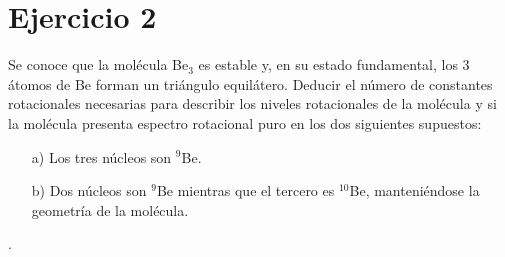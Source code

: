 \documentclass{article}
\begin{document}
\section*{Ejercicio 2}
Se conoce que la molécula Be$_3$ es estable y, en su estado fundamental, los 3 átomos de Be forman un triángulo equilátero. Deducir el número de constantes rotacionales necesarias para describir los niveles rotacionales de la molécula y si la molécula presenta espectro rotacional puro en los dos siguientes supuestos:
\begin{enumerate}
    \item[a)] Los tres núcleos son $^9$Be.

    \item[b)] Dos núcleos son $^9$Be mientras que el tercero es $^{10}$Be, manteniéndose la geometría de la molécula.
\end{enumerate}
.\dotfill 

\end{document}

